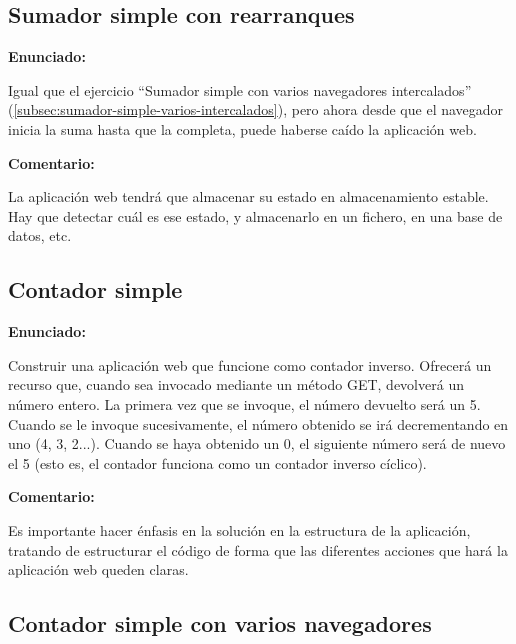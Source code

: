 \subsection{Sumador simple con rearranques}
\label{subsec:sumador-simple-rearranques}

\textbf{Enunciado:}

Igual que el ejercicio ``Sumador simple con varios navegadores intercalados'' (\ref{subsec:sumador-simple-varios-intercalados}), pero ahora desde que el navegador inicia la suma hasta que la completa, puede haberse caído la aplicación web.

\textbf{Comentario:}

La aplicación web tendrá que  almacenar su estado en almacenamiento estable. Hay que detectar cuál es ese estado, y almacenarlo en  un fichero, en  una base de datos, etc.


\subsection{Contador simple}
\label{subsec:contador-simple}

\textbf{Enunciado:}

Construir una aplicación web que funcione como contador inverso. Ofrecerá un recurso que, cuando sea invocado mediante un método GET, devolverá un número entero. La primera vez que se invoque, el número devuelto será un 5. Cuando se le invoque sucesivamente, el número obtenido se irá decrementando en uno (4, 3, 2...). Cuando se haya obtenido un 0, el siguiente número será de nuevo el 5 (esto es, el contador funciona como un contador inverso cíclico).

\textbf{Comentario:}

Es importante hacer énfasis en la solución en la estructura de la aplicación, tratando de estructurar el código de forma que las diferentes acciones que hará la aplicación web queden claras.

\subsection{Contador simple con varios navegadores}
\label{subsec:contador-simple-varios}

